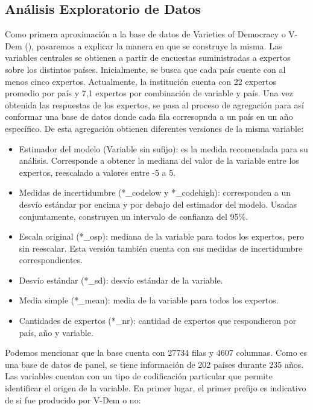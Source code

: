 \documentclass{article}
\begin{document}
\subsection{Análisis Exploratorio de Datos}
Como primera aproximación a la base de datos de Varieties of Democracy o V-Dem 
(\cite{CopMet24}), pasaremos a explicar la manera en que se construye la misma. Las
variables centrales se obtienen a partir de encuestas suministradas a expertos
sobre los distintos países. Inicialmente, se busca que cada país cuente con al menos
cinco expertos. Actualmente, la institución cuenta con 22 expertos promedio por país
y 7,1 expertos por combinación de variable y país. Una vez obtenida las respuestas
de los expertos, se pasa al proceso de agregación para así conformar una base de 
datos donde cada fila corresopnda a un país en un año específico. De esta agregación
obtienen diferentes versiones de la misma variable:

\begin{itemize}
  \item Estimador del modelo (Variable sin sufijo): es la medida
   recomendada para su análisis. Corresponde a obtener la mediana del valor de 
   la variable entre los expertos, reescalado a valores entre -5 a 5.
  \item Medidas de incertidumbre (*\_codelow y *\_codehigh): corresponden a un 
  desvío estándar por encima y por debajo del estimador del modelo. 
  Usadas conjuntamente, construyen un intervalo de confianza del 95\%.
  \item Escala original (*\_osp): mediana de la variable para todos los expertos, pero sin 
  reescalar. Esta versión también cuenta con sus medidas de incertidumbre correspondientes.
  \item Desvío estándar (*\_sd): desvío estándar de la variable.
  \item Media simple (*\_mean): media de la variable para todos los expertos.
  \item Cantidades de expertos (*\_nr): cantidad de expertos que respondieron por
  país, año y variable.
\end{itemize}

Podemos mencionar que la base cuenta con 27734 filas y 4607 columnas. Como es una 
base de datos de panel, se tiene información de 202 países durante 235 años. Las 
variables cuentan con un tipo de codificación particular que permite identificar el 
origen de la  variable. En primer lugar, el primer prefijo es indicativo de si fue 
producido por V-Dem o no:
\end{document}
